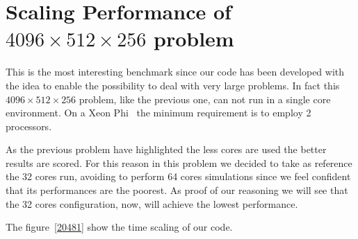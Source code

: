 \section{Scaling Performance of $4096\times512\times256$ problem}
This is the most interesting benchmark since our code has been developed with the idea to enable the possibility to deal with very large problems.
In fact this $4096\times 512 \times 256$ problem, like the previous one, can not run in a single core environment.
On a Xeon Phi~\cite{intel:xeonphi} the minimum requirement is to employ 2 processors.
\par
As the previous problem have highlighted the less cores are used the better results are scored.
For this reason in this problem we decided to take as reference the 32 cores run, avoiding to perform 64 cores simulations since we feel confident that its performances are the poorest. As proof of our reasoning we will see that the 32 cores configuration, now, will achieve the lowest performance.  \\
\par
The figure~\ref{20481} show the time scaling of our code.